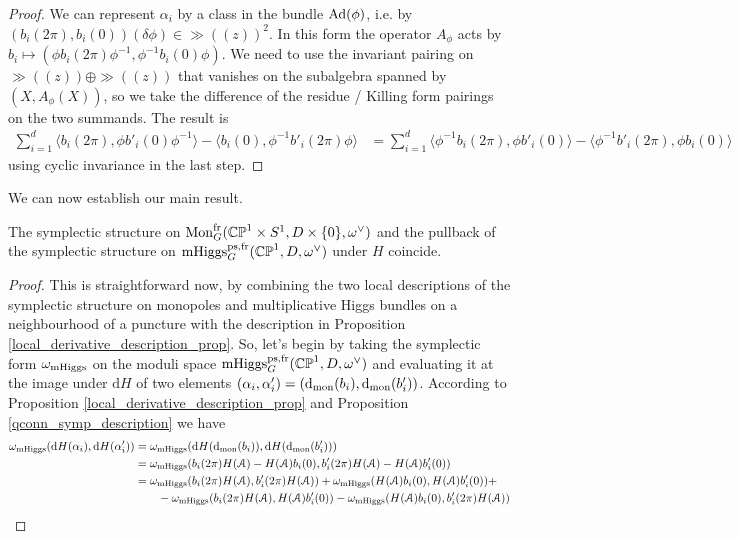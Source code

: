 \documentclass[10pt, oneside]{article}
\DeclareMathOperator{\mhiggs}{mHiggs}
\DeclareMathOperator{\mon}{Mon}
\renewcommand{\d}{\mathrm{d}}
\newcommand{\fr}{\mathrm{fr}}
\newcommand{\Ad}{\mr{Ad}}
\begin{document}
\begin{proof}
We can represent $\alpha_i$ by a class in the bundle $\Ad(\phi)$, i.e. by $(b_i(2\pi), b_i(0))(\delta \phi) \in \gg((z))^2$.  In this form the operator $A_\phi$ acts by $b_i \mapsto (\phi b_i(2\pi) \phi^{-1}, \phi^{-1} b_i(0) \phi)$.  We need to use the invariant pairing on $\gg((z)) \oplus \gg((z))$ that vanishes on the subalgebra spanned by $(X, A_\phi(X))$, so we take the difference of the residue / Killing form pairings on the two summands.  The result is
\begin{align*}
 \sum_{i=1}^d \langle b_i(2\pi), \phi b'_i(0) \phi^{-1} \rangle - \langle b_i(0), \phi^{-1} b'_i(2\pi) \phi \rangle 
&= \sum_{i=1}^d \langle \phi^{-1} b_i(2\pi), \phi b'_i(0) \rangle - \langle \phi^{-1} b'_i(2\pi), \phi b_i(0) \rangle
\end{align*}
using cyclic invariance in the last step. 
\end{proof}

We can now establish our main result.
\begin{theorem}
The symplectic structure on $\mon_G^\fr(\bb{CP}^1 \times S^1,D \times\{0\},\omega^\vee)$ and the pullback of the symplectic structure on $\mhiggs_G^{\text{ps,fr}}(\bb{CP}^1,D,\omega^\vee)$ under $H$ coincide.
\end{theorem}

\begin{proof}
This is straightforward now, by combining the two local descriptions of the symplectic structure on monopoles and multiplicative Higgs bundles on a neighbourhood of a puncture with the description in Proposition \ref{local_derivative_description_prop}.  So, let's begin by taking the symplectic form $\omega_{\mathrm{mHiggs}}$ on the moduli space $\mhiggs_G^{\text{ps,fr}}(\bb{CP}^1,D,\omega^\vee)$ and evaluating it at the image under $\d H$ of two elements $(\alpha_i, \alpha'_i) = (\d_{\mr{mon}}(b_i), \d_{\mr{mon}}(b_i'))$.  According to Proposition \ref{local_derivative_description_prop} and Proposition \ref{qconn_symp_description} we have
\begin{align*}
\omega_{\mr{mHiggs}}(\d H(\alpha_i), \d H(\alpha_i')) &= \omega_{\mr{mHiggs}}(\d H(\d_{\mr{mon}}(b_i)), \d H(\d_{\mr{mon}}(b_i'))) \\
&= \omega_{\mr{mHiggs}}(b_i(2\pi)H(\mc A) - H(\mc A)b_i(0),b'_i(2\pi)H(\mc A) - H(\mc A)b'_i(0)) \\
&= \omega_{\mr{mHiggs}}(b_i(2\pi)H(\mc A), b'_i(2\pi)H(\mc A)) + \omega_{\mr{mHiggs}}(H(\mc A)b_i(0), H(\mc A)b'_i(0)) + \\
&\qquad -\omega_{\mr{mHiggs}}(b_i(2\pi)H(\mc A), H(\mc A)b'_i(0)) - \omega_{\mr{mHiggs}}(H(\mc A)b_i(0), b'_i(2\pi)H(\mc A))
\end{align*}
\end{proof}
\end{document}
